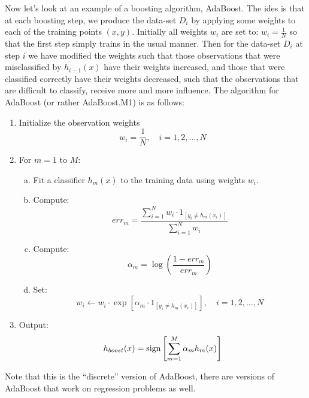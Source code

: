     Now let's look at an example of a boosting algorithm, AdaBoost. The ides is 
    that at each boosting step, we produce the data-set $D_i$ by applying some 
    weights to each of the training points $(x,y)$. Initially all weights $w_i$ 
    are set to: $w_i=\frac{1}{N}$ so that the first step simply trains in the 
    usual manner. Then for the data-set $D_i$ at step $i$ we have modified the 
    weights such that those observations that were misclassified by 
    $h_{i-1}(x)$ have their weights increased, and those that were classified 
    correctly have their weights decreased, such that the observations that are 
    difficult to classify, receive more and more influence. The algorithm for 
    AdaBoost (or rather AdaBoost.M1) is as follows:
    \begin{enumerate}
        \item Initialize the observation weights 
        \begin{equation*}
            w_i=\frac{1}{N}, \quad i=1,2,\dots,N
        \end{equation*}
        \item For $m=1$ to $M$:
        \begin{enumerate}[a)]
            \item Fit a classifier $h_m(x)$ to the training data using weights 
            $w_i$.
            \item Compute:
            \begin{equation*}
                err_m=\frac{\sum_{i=1}^{N}w_i \cdot 1_{[y_i \neq 
                h_m(x_i)]}}{\sum_{i=1}^{N}w_i}
            \end{equation*}
            \item Compute:
            \begin{equation*}
                \alpha_m=\log\left(\frac{1-err_m}{err_m}\right)
            \end{equation*}
            \item Set:
            \begin{equation*}
                w_i \leftarrow w_i \cdot \exp\left[\alpha_m \cdot 1_{[y_i \neq 
                h_m(x_i)]}\right], \quad i=1,2,\dots,N
            \end{equation*}
        \end{enumerate}
        \item Output:
        \begin{equation*}
            h_{boost}(x)=\text{sign} \left[\sum_{m=1}^{M}\alpha_m h_m(x)\right]
        \end{equation*}
    \end{enumerate}
    Note that this is the ``discrete'' version of AdaBoost, there are versions 
    of AdaBoost that work on regression problems as well.
    
